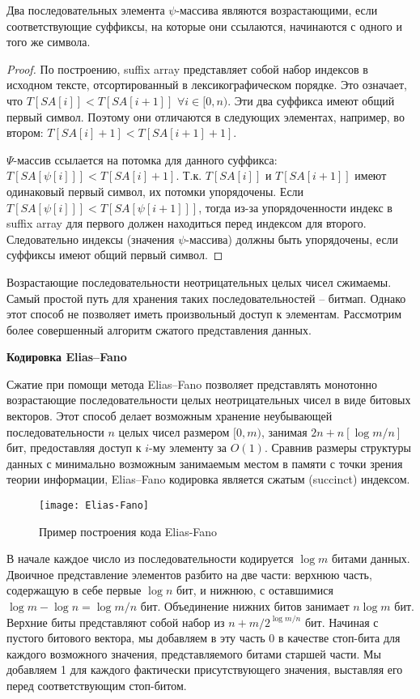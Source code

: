 \begin{theorem}
 \label{lemma:1}
 Два последовательных элемента $\psi$-массива являются возрастающими, если соответствующие суффиксы,
 на которые они ссылаются, начинаются с одного и того же символа.
\end{theorem}

\begin{proof}
 По построению, suffix array представляет собой набор индексов в исходном тексте,
 отсортированный в лексикографическом порядке. Это означает, что $T[SA[i]] < T[SA[i + 1]]$
 $\forall i \in [0, n).$ Эти два суффикса имеют общий первый символ. Поэтому они отличаются в следующих
 элементах, например, во втором: $T[SA[i] + 1] < T[SA[i + 1] + 1].$

 $\Psi$-массив ссылается на потомка для данного суффикса: $T[SA[\psi[i]]] < T[SA[i] + 1].$
 Т.к. $T[SA[i]]$ и $T[SA[i + 1]]$ имеют одинаковый первый символ, их потомки упорядочены.
 Если $T[SA[\psi[i]]] < T[SA[\psi[i + 1]]]$, тогда из-за упорядоченности индекс в suffix array
 для первого должен находиться перед индексом для второго. Следовательно индексы (значения $\psi$-массива)
 должны быть упорядочены, если суффиксы имеют общий первый символ.
\end{proof}

Возрастающие последовательности неотрицательных целых чисел сжимаемы.
Самый простой путь для хранения таких последовательностей -- битмап.
Однако этот способ не позволяет иметь произвольный доступ к элементам.
Рассмотрим более совершенный алгоритм сжатого представления данных.

\textbf{Кодировка Elias--Fano}

Сжатие при помощи метода Elias--Fano позволяет представлять монотонно возрастающие последовательности
целых неотрицательных чисел в виде битовых векторов. Этот способ делает возможным
хранение неубывающей последовательности $n$ целых чисел размером $[0, m)$,
занимая $2n + n[\log m/n]$ бит, предоставляя доступ к $i$-му элементу за $O(1)$.
Сравнив размеры структуры данных с минимально возможным занимаемым местом в памяти
с точки зрения теории информации, Elias--Fano кодировка является сжатым (succinct) индексом.

\begin{figure}[t]
 \texttt{[image: Elias-Fano]}
 \caption{Пример построения кода Elias-Fano}
 \centering
 \label{fig:EF}
\end{figure}

В начале каждое число из последовательности кодируется $\log m$ битами данных.
Двоичное представление элементов разбито на две части: верхнюю часть, содержащую в себе
первые $\log n$ бит, и нижнюю, с оставшимися $\log m - \log n = \log m / n$ бит.
Объединение нижних битов занимает $n \log m$ бит. Верхние биты представляют собой
набор из $n + m / 2^{\log m/n}$ бит. Начиная с пустого битового вектора, мы добавляем в эту часть 0
в качестве стоп-бита для каждого возможного значения, представляемого битами старшей части.
Мы добавляем 1 для каждого фактически присутствующего значения, выставляя его перед соответствующим стоп-битом.

